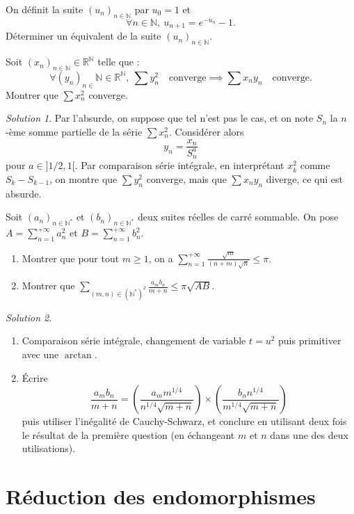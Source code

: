 \documentclass[french]{book}
\newcommand{\N}{\mathbb{N}}
\newcommand{\R}{\mathbb{R}}
\newcommand{\st}{^*}
\theoremstyle{definition}
\theoremstyle{remark}
\newtheorem*{sol}{Solution}
\begin{document}
\begin{exo}[2]{}
	On définit la suite $(u_n)_{n\in\N}$ par $u_0=1$ et $$\forall n\in\N,\ u_{n+1}=e^{-u_n}-1.$$ Déterminer un équivalent de la suite $(u_n)_{n\in\N}$.
\end{exo}

\begin{exo}[2]{}
	Soit $(x_n)_{n\in\N}\in\R^\N$ telle que :
	$$\forall (y_n)_{n\in}\N\in\R^\N,\ \sum y_n^2\quad\text{converge}\implies\sum x_ny_n\quad\text{converge}.$$
	Montrer que $\displaystyle\sum x_n^2$ converge.
\end{exo}
\begin{sol}
	Par l'absurde, on suppose que tel n'est pas le cas, et on note $S_n$ la $n$-ème somme partielle de la série $\displaystyle\sum x_n^2$. Considérer alors $$y_n=\frac{x_n}{S_n^a}$$ pour $a\in]1/2,1[$. Par comparaison série intégrale, en interprétant $x_k^2$ comme $S_k-S_{k-1}$, on montre que $\sum y_n^2$ converge, mais que $\sum x_n y_n$ diverge, ce qui est absurde.
\end{sol}

\begin{exo}[2]{}
	Soit $(a_n)_{n\in\N\st}$ et $(b_n)_{n\in\N\st}$ deux suites réelles de carré sommable. On pose $A=\displaystyle\sum_{n=1}^{+\infty}a_n^2$ et $B=\displaystyle\sum_{n=1}^{+\infty}b_n^2$.
	\begin{enumerate}
		\item Montrer que pour tout $m\geqslant1$, on a $\displaystyle\sum_{n=1}^{+\infty}\frac{\sqrt{m}}{(n+m)\sqrt{n}}\leqslant\pi$.
		\item Montrer que $\displaystyle\sum_{(m,n)\in(\N\st)^2}\frac{a_mb_n}{m+n}\leqslant\pi\sqrt{AB}$.
	\end{enumerate}
\end{exo}
\begin{sol}
	\begin{enumerate}
		\item Comparaison série intégrale, changement de variable $t=u^2$ puis primitiver avec une $\arctan$.
		\item Écrire $$\frac{a_m b_n}{m+n}=\left(\frac{a_mm^{1/4}}{n^{1/4}\sqrt{m+n}}\right)\times\left(\frac{b_n n^{1/4}}{m^{1/4}\sqrt{m+n}}\right)$$ puis utiliser l'inégalité de Cauchy-Schwarz, et conclure en utilisant deux fois le résultat de la première question (en échangeant $m$ et $n$ dans une des deux utilisations).
	\end{enumerate}
\end{sol}

\chapter{Réduction des endomorphismes}
\end{document}
